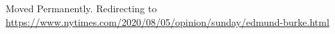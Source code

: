 Moved Permanently. Redirecting to
\href{https://www.nytimes.com/2020/08/05/opinion/sunday/edmund-burke.html}{https://www.nytimes.com/2020/08/05/opinion/sunday/edmund-burke.html}
